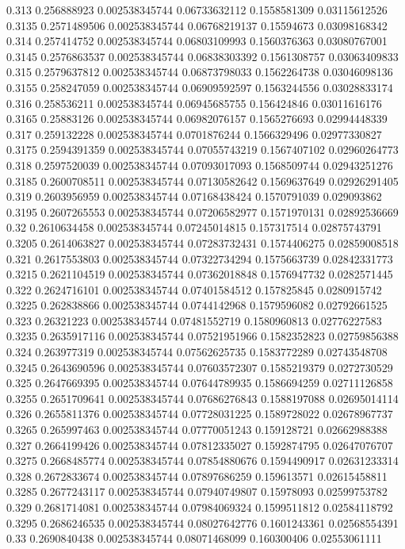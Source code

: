 {0.313 0.256888923 0.002538345744 0.06733632112 0.1558581309 0.03115612526
0.3135 0.2571489506 0.002538345744 0.06768219137 0.15594673 0.03098168342
0.314 0.257414752 0.002538345744 0.06803109993 0.1560376363 0.03080767001
0.3145 0.2576863537 0.002538345744 0.06838303392 0.1561308757 0.03063409833
0.315 0.2579637812 0.002538345744 0.06873798033 0.1562264738 0.03046098136
0.3155 0.258247059 0.002538345744 0.06909592597 0.1563244556 0.03028833174
0.316 0.258536211 0.002538345744 0.06945685755 0.156424846 0.03011616176
0.3165 0.25883126 0.002538345744 0.06982076157 0.1565276693 0.02994448339
0.317 0.259132228 0.002538345744 0.0701876244 0.1566329496 0.02977330827
0.3175 0.2594391359 0.002538345744 0.07055743219 0.1567407102 0.02960264773
0.318 0.2597520039 0.002538345744 0.07093017093 0.1568509744 0.02943251276
0.3185 0.2600708511 0.002538345744 0.07130582642 0.1569637649 0.02926291405
0.319 0.2603956959 0.002538345744 0.07168438424 0.1570791039 0.029093862
0.3195 0.2607265553 0.002538345744 0.07206582977 0.1571970131 0.02892536669
0.32 0.2610634458 0.002538345744 0.07245014815 0.157317514 0.02875743791
0.3205 0.2614063827 0.002538345744 0.07283732431 0.1574406275 0.02859008518
0.321 0.2617553803 0.002538345744 0.07322734294 0.1575663739 0.02842331773
0.3215 0.2621104519 0.002538345744 0.07362018848 0.1576947732 0.0282571445
0.322 0.2624716101 0.002538345744 0.07401584512 0.157825845 0.0280915742
0.3225 0.262838866 0.002538345744 0.0744142968 0.1579596082 0.02792661525
0.323 0.26321223 0.002538345744 0.07481552719 0.1580960813 0.02776227583
0.3235 0.2635917116 0.002538345744 0.07521951966 0.1582352823 0.02759856388
0.324 0.263977319 0.002538345744 0.07562625735 0.1583772289 0.02743548708
0.3245 0.2643690596 0.002538345744 0.07603572307 0.1585219379 0.0272730529
0.325 0.2647669395 0.002538345744 0.07644789935 0.1586694259 0.02711126858
0.3255 0.2651709641 0.002538345744 0.07686276843 0.1588197088 0.02695014114
0.326 0.2655811376 0.002538345744 0.07728031225 0.1589728022 0.02678967737
0.3265 0.265997463 0.002538345744 0.07770051243 0.159128721 0.02662988388
0.327 0.2664199426 0.002538345744 0.07812335027 0.1592874795 0.02647076707
0.3275 0.2668485774 0.002538345744 0.07854880676 0.1594490917 0.02631233314
0.328 0.2672833674 0.002538345744 0.07897686259 0.159613571 0.02615458811
0.3285 0.2677243117 0.002538345744 0.07940749807 0.15978093 0.02599753782
0.329 0.2681714081 0.002538345744 0.07984069324 0.1599511812 0.02584118792
0.3295 0.2686246535 0.002538345744 0.08027642776 0.1601243361 0.02568554391
0.33 0.2690840438 0.002538345744 0.08071468099 0.160300406 0.02553061111
}
